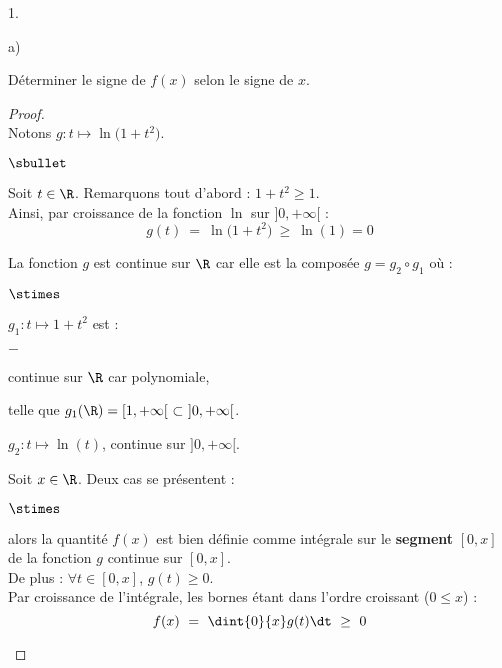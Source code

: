 \begin{noliste}{1.}
  \setlength{\itemsep}{4mm}
\item
  \begin{noliste}{a)}
    \setlength{\itemsep}{2mm}
  \item Déterminer le signe de $f(x)$ selon le signe de $x$.
  \end{noliste}
    
  \begin{proof}~\\%
    Notons $g : t \mapsto \ln\big( 1 + t^2 \big)$.
    \begin{noliste}{$\sbullet$}
    \item Soit $t \in \R$. Remarquons tout d'abord : $1 + t^2 \geq 1$.\\
      Ainsi, par croissance de la fonction $\ln$ sur $]0, +\infty[$ :
      \[
      g(t) \ = \ \ln\big( 1 + t^2 \big) \ \geq \ \ln(1) = 0
      \]

    \item La fonction $g$ est continue sur $\R$ car elle est la
      composée $g = g_2 \circ g_1$ où :
      \begin{noliste}{$\stimes$}
      \item $g_1 : t \mapsto 1 + t^2$ est : 
        \begin{noliste}{$-$}
        \item continue sur $\R$ car polynomiale,
        \item telle que $g_1(\R) = [1, +\infty[ \ \subset \ ]0,
          +\infty[$.
        \end{noliste}
        
      \item $g_2 : t \mapsto \ln(t)$, continue sur $]0, +\infty[$.
      \end{noliste}

    \item Soit $x \in \R$. Deux cas se présentent :
      \begin{noliste}{$\stimes$}
      \item {} alors la quantité $f(x)$ est bien
        définie comme intégrale sur le {\bf segment} $[0, x]$ de la
        fonction $g$ continue sur $[0, x]$.\\
        De plus : $\forall t \in [0, x]$, $g(t) \geq 0$.\\[.2cm]
        Par croissance de l'intégrale, les bornes étant dans l'ordre
        croissant ($0 \leq x$) :
        \[
        f(x) \ = \ \dint{0}{x} g(t) \dt \ \geq \ 0
        \]


\end{noliste}
\end{noliste}
\end{proof}
\end{noliste}
